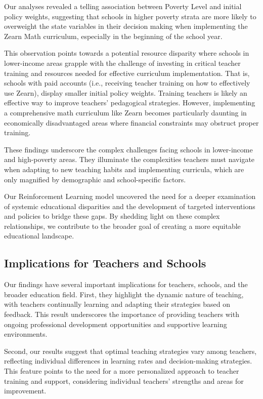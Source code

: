 \documentclass[
  number,
  preprint,
  3p,
  onecolumn]{elsarticle}
\begin{document}
Our analyses revealed a telling association between Poverty Level and
initial policy weights, suggesting that schools in higher poverty strata
are more likely to overweight the state variables in their decision
making when implementing the Zearn Math curriculum, especially in the
beginning of the school year.

This observation points towards a potential resource disparity where
schools in lower-income areas grapple with the challenge of investing in
critical teacher training and resources needed for effective curriculum
implementation. That is, schools with paid accounts (i.e., receiving
teacher training on how to effectively use Zearn), display smaller
initial policy weights. Training teachers is likely an effective way to
improve teachers' pedagogical strategies. However, implementing a
comprehensive math curriculum like Zearn becomes particularly daunting
in economically disadvantaged areas where financial constraints may
obstruct proper training.

These findings underscore the complex challenges facing schools in
lower-income and high-poverty areas. They illuminate the complexities
teachers must navigate when adapting to new teaching habits and
implementing curricula, which are only magnified by demographic and
school-specific factors.

Our Reinforcement Learning model uncovered the need for a deeper
examination of systemic educational disparities and the development of
targeted interventions and policies to bridge these gaps. By shedding
light on these complex relationships, we contribute to the broader goal
of creating a more equitable educational landscape.

\subsection{Implications for Teachers and
Schools}\label{implications-for-teachers-and-schools}

Our findings have several important implications for teachers, schools,
and the broader education field. First, they highlight the dynamic
nature of teaching, with teachers continually learning and adapting
their strategies based on feedback. This result underscores the
importance of providing teachers with ongoing professional development
opportunities and supportive learning environments.

Second, our results suggest that optimal teaching strategies vary among
teachers, reflecting individual differences in learning rates and
decision-making strategies. This feature points to the need for a more
personalized approach to teacher training and support, considering
individual teachers' strengths and areas for improvement.
\end{document}
